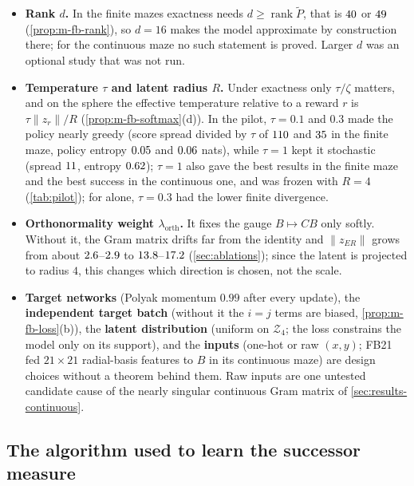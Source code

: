\begin{itemize}[nosep]
\item \textbf{Rank $d$.} In the finite mazes exactness needs $d\ge\operatorname{rank}\tilde P$, that is $\vn{env.rank.4r}{40}$ or $\vn{env.rank.open}{49}$ (\cref{prop:m-fb-rank}), so $d=16$ makes the model approximate by construction there; for the continuous maze no such statement is proved. Larger $d$ was an optional study that was not run.
\item \textbf{Temperature $\tau$ and latent radius $R$.} Under exactness only $\tau/\zeta$ matters, and on the sphere the effective temperature relative to a reward $r$ is $\tau\lVert z_r\rVert/R$ (\cref{prop:m-fb-softmax}(d)). In the pilot, $\tau=0.1$ and $0.3$ made the \DMFB{} policy nearly greedy (score spread divided by $\tau$ of $\vn{s09.pilot.spread.0.1}{110}$ and $\vn{s09.pilot.spread.0.3}{35}$ in the finite maze, policy entropy $\vn{s09.pilot.ent.0.1}{0.05}$ and $\vn{s09.pilot.ent.0.3}{0.06}$ nats), while $\tau=1$ kept it stochastic (spread $\vn{s09.pilot.spread.1}{11}$, entropy $\vn{s09.pilot.ent.1}{0.62}$); $\tau=1$ also gave the best \ERFB{} results in the finite maze and the best \ERFB{} success in the continuous one, and was frozen with $R=4$ (\cref{tab:pilot}); for \DMFB{} alone, $\tau=0.3$ had the lower finite divergence.
\item \textbf{Orthonormality weight $\lambda_{\mathrm{orth}}$.} It fixes the gauge $B\mapsto CB$ only softly. Without it, the Gram matrix drifts far from the identity and $\lVert z_{ER}\rVert$ grows from about $\vn{s09.erz.base.lo}{2.6}$--$\vn{s09.erz.base.hi}{2.9}$ to $\vn{s09.erz.noorth.lo}{13.8}$--$\vn{s09.erz.noorth.hi}{17.2}$ (\cref{sec:ablations}); since the latent is projected to radius $4$, this changes which direction is chosen, not the scale.
\item \textbf{Target networks} (Polyak momentum $0.99$ after every update), the \textbf{independent target batch} (without it the $i=j$ terms are biased, \cref{prop:m-fb-loss}(b)), the \textbf{latent distribution} (uniform on $\mathcal Z_4$; the loss constrains the model only on its support), and the \textbf{inputs} (one-hot or raw $(x,y)$; FB21 fed $21\times21$ radial-basis features to $B$ in its continuous maze) are design choices without a theorem behind them. Raw inputs are one untested candidate cause of the nearly singular continuous Gram matrix of \cref{sec:results-continuous}.
\end{itemize}

\subsection{The algorithm used to learn the successor measure}\label{sec:m-hyper-learn}

